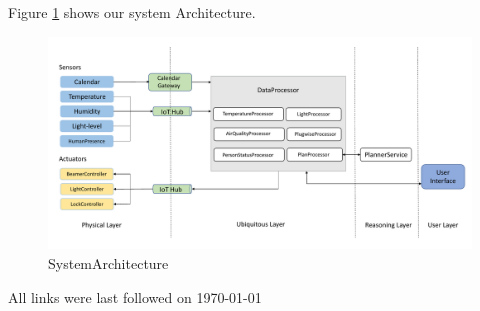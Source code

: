 \documentclass[runningheads]{llncs}
\begin{document}
Figure \ref{fig:SystemArchitecture} shows our system Architecture.

\begin{figure}
	\centering
		\includegraphics[width=1.0\textwidth]{../img/SystemArchitecture.pdf}
	\caption{SystemArchitecture}
	\label{fig:SystemArchitecture}
\end{figure}







%
%



All links were last followed on \today
\end{document}
